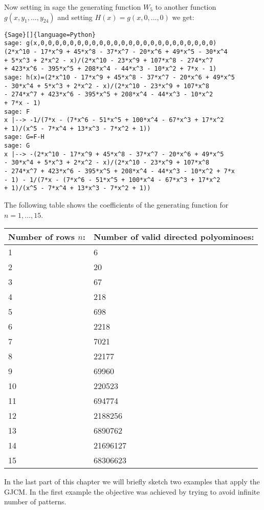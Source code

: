 \documentclass[12pt]{report}
\begin{document}
{{\noindent Now setting in sage the generating function $W_5$ to another function $g(x,y_1,\ldots,y_{24})$ and setting $H(x)=g(x,0,\ldots,0)$ we get:
{
\begin{lstlisting}{Sage}[]{language=Python}
sage: g(x,0,0,0,0,0,0,0,0,0,0,0,0,0,0,0,0,0,0,0,0,0,0,0,0)
(2*x^10 - 17*x^9 + 45*x^8 - 37*x^7 - 20*x^6 + 49*x^5 - 30*x^4 
+ 5*x^3 + 2*x^2 - x)/(2*x^10 - 23*x^9 + 107*x^8 - 274*x^7 
+ 423*x^6 - 395*x^5 + 208*x^4 - 44*x^3 - 10*x^2 + 7*x - 1)
sage: h(x)=(2*x^10 - 17*x^9 + 45*x^8 - 37*x^7 - 20*x^6 + 49*x^5 
- 30*x^4 + 5*x^3 + 2*x^2 - x)/(2*x^10 - 23*x^9 + 107*x^8 
- 274*x^7 + 423*x^6 - 395*x^5 + 208*x^4 - 44*x^3 - 10*x^2 
+ 7*x - 1)
sage: F
x |--> -1/(7*x - (7*x^6 - 51*x^5 + 100*x^4 - 67*x^3 + 17*x^2 
+ 1)/(x^5 - 7*x^4 + 13*x^3 - 7*x^2 + 1))
sage: G=F-H
sage: G
x |--> -(2*x^10 - 17*x^9 + 45*x^8 - 37*x^7 - 20*x^6 + 49*x^5 
- 30*x^4 + 5*x^3 + 2*x^2 - x)/(2*x^10 - 23*x^9 + 107*x^8 
- 274*x^7 + 423*x^6 - 395*x^5 + 208*x^4 - 44*x^3 - 10*x^2 + 7*x 
- 1) - 1/(7*x - (7*x^6 - 51*x^5 + 100*x^4 - 67*x^3 + 17*x^2 
+ 1)/(x^5 - 7*x^4 + 13*x^3 - 7*x^2 + 1))
\end{lstlisting}}
 

\noindent The following table shows the coefficients of the generating function for $n=1,\ldots,15$.

\begin{center}
\begin{tabular}{ |p{3cm}|p{3cm}|  }
 \hline
 Number of rows 	$n$: & Number of valid directed polyominoes: \\
 \hline
 1   & 6    \\
 2 &   20  \\
 3 & 67 \\
 4    & 218 \\
 5 &   698  \\
 6 & 2218  \\
 7 & 7021  \\
 8 & 22177  \\
 9 & 69960  \\
 10 & 220523  \\
 11 & 694774  \\
 12 & 2188256  \\
 13 & 6890762  \\
 14 & 21696127  \\
 15 & 68306623 \\
 \hline
\end{tabular}
\end{center}

\noindent In the last part of this chapter we will briefly sketch two examples that apply the GJCM. In the first example the objective was achieved by trying to avoid infinite number of patterns.


}}
\end{document}
